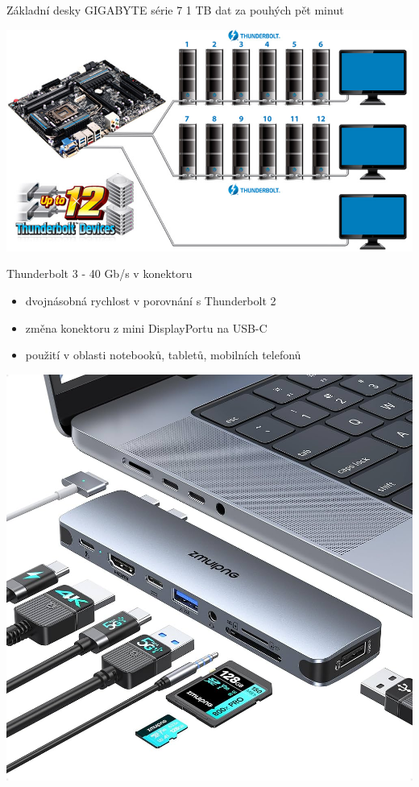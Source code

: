 \documentclass[aspectratio=43]{beamer}
\begin{document}
\begin{frame}{Základní desky GIGABYTE série 7}
	1 TB dat za pouhých pět minut
	
	\begin{center}
		\includegraphics[width=1\linewidth]{extrahovane_obrazky/img_4_page7_0.jpeg}
	\end{center}
	
\end{frame}


\begin{frame}{Thunderbolt 3 - 40 Gb/s v konektoru}
	\begin{itemize}
		\item dvojnásobná rychlost v porovnání s Thunderbolt 2
		\item změna konektoru z mini DisplayPortu na USB-C
		\item použití v oblasti notebooků, tabletů, mobilních telefonů
	\end{itemize}
	\begin{center}
		\includegraphics[width=0.55\linewidth]{extrahovane_obrazky/mac.jpg}
	\end{center}
	
\end{frame}
\end{document}
